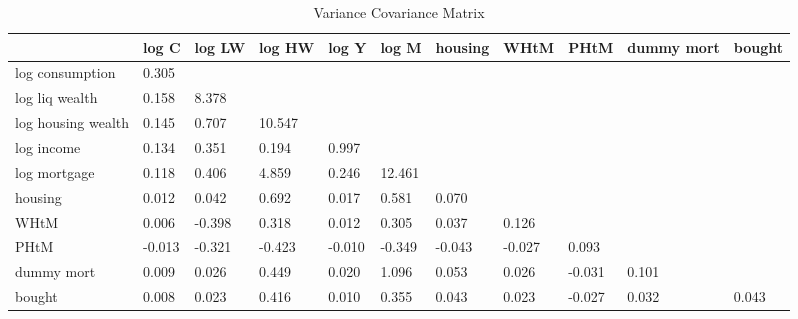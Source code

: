 \begin{table}[htbp]
\caption{\label{clabel} Variance Covariance Matrix}\centering\medskip
\begin{tabular}{lllllllllll} \hline \hline
 & log C  & log LW  & log HW  & log Y  & log M  & housing  & WHtM  & PHtM  & dummy mort  & bought  \\  \hline 
log consumption &     0.305 \\  
log liq wealth &     0.158 &     8.378 \\  
log housing wealth &     0.145 &     0.707 &    10.547 \\  
log income &     0.134 &     0.351 &     0.194 &     0.997 \\  
log mortgage &     0.118 &     0.406 &     4.859 &     0.246 &    12.461 \\  
housing &     0.012 &     0.042 &     0.692 &     0.017 &     0.581 &     0.070 \\  
WHtM &     0.006 &    -0.398 &     0.318 &     0.012 &     0.305 &     0.037 &     0.126 \\  
PHtM &    -0.013 &    -0.321 &    -0.423 &    -0.010 &    -0.349 &    -0.043 &    -0.027 &     0.093 \\  
dummy mort &     0.009 &     0.026 &     0.449 &     0.020 &     1.096 &     0.053 &     0.026 &    -0.031 &     0.101 \\  
bought &     0.008 &     0.023 &     0.416 &     0.010 &     0.355 &     0.043 &     0.023 &    -0.027 &     0.032 &     0.043 \\  
\hline \hline \end{tabular}
\end{table}
